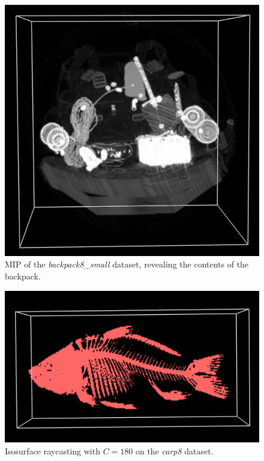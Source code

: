 \documentclass[a4paper]{article}
\begin{document}
\begin{figure}[h]
  \centering
  \includegraphics[width=\textwidth]{backpack-MIP}
  \caption{MIP of the \textit{backpack8\_small} dataset, revealing the contents of the backpack.}
  \label{fig:backpack-mip}
\end{figure}

\begin{figure}[h]
  \centering
  \includegraphics[width=\textwidth]{carp-iso-180}
  \caption{Isosurface raycasting with $C = 180$ on the \textit{carp8} dataset.}
  \label{fig:carp-skelet}
\end{figure}
\end{document}
